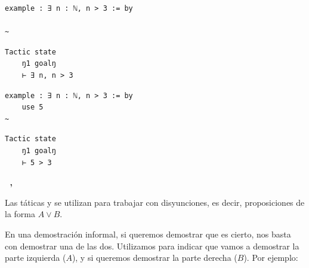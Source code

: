 \begin{minipage}[t]{0.58\textwidth}
\begin{lstlisting}[language=lean]
  example : ∃ n : ℕ, n > 3 := by

~
\end{lstlisting}
\end{minipage}%
\hfill
\begin{minipage}[t]{0.40\textwidth}
\begin{lstlisting}[language=infoview]
  Tactic state
    ŋ1 goalŋ
    ⊢ ∃ n, n > 3
\end{lstlisting}
\end{minipage}
%
\noindent
\makebox[\textwidth]{$\downarrow$}
%
\begin{minipage}[t]{0.58\textwidth}
\begin{lstlisting}[language=lean]
  example : ∃ n : ℕ, n > 3 := by
    use 5
~
\end{lstlisting}
\end{minipage}%
\hfill
\begin{minipage}[t]{0.40\textwidth}
\begin{lstlisting}[language=infoview]
  Tactic state
    ŋ1 goalŋ
    ⊢ 5 > 3
\end{lstlisting}
\end{minipage}


\vspace{1em}
\noindent\textbf{$~$ , }

Las táticas  y  se utilizan para trabajar con disyunciones, es decir, proposiciones de la forma $A \lor B$.

En una demostración informal, si queremos demostrar que  es cierto, nos basta con demostrar una de las dos. Utilizamos  para indicar que vamos a demostrar la parte izquierda ($A$), y  si queremos demostrar la parte derecha ($B$). Por ejemplo:

